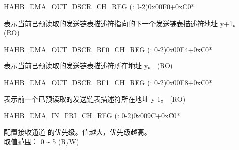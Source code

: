 \begin{register}{H}{AHB\_DMA\_OUT\_DSCR\_CH\_REG (: 0-2)}{0x00F0+0xC0*}\label{regdesc:AHBDMAOUTDSCRCHNREG}
%
\regnewline%
\begin{regdesc}\begin{reglist}
\label{fielddesc:AHBDMAOUTLINKDSCRCHN}\item [AHB\_DMA\_OUTLINK\_DSCR\_CH\regindex{n}] 表示当前已预读取的发送链表描述符指向的下一个发送链表描述符地址 y+1。 (RO)
\end{reglist}\end{regdesc}
\end{register}


\begin{register}{H}{AHB\_DMA\_OUT\_DSCR\_BF0\_CH\_REG (: 0-2)}{0x00F4+0xC0*}\label{regdesc:AHBDMAOUTDSCRBF0CHNREG}
%
\regnewline%
\begin{regdesc}\begin{reglist}
\label{fielddesc:AHBDMAOUTLINKDSCRBF0CHN}\item [AHB\_DMA\_OUTLINK\_DSCR\_BF0\_CH\regindex{n}] 表示当前已预读取的发送链表描述符所在地址 y。 (RO)
\end{reglist}\end{regdesc}
\end{register}


\begin{register}{H}{AHB\_DMA\_OUT\_DSCR\_BF1\_CH\_REG (: 0-2)}{0x00F8+0xC0*}\label{regdesc:AHBDMAOUTDSCRBF1CHNREG}
%
\regnewline%
\begin{regdesc}\begin{reglist}
\label{fielddesc:AHBDMAOUTLINKDSCRBF1CHN}\item [AHB\_DMA\_OUTLINK\_DSCR\_BF1\_CH\regindex{n}] 表示前一个已预读取的发送链表描述符所在地址 y-1。 (RO)
\end{reglist}\end{regdesc}
\end{register}


\begin{register}{H}{AHB\_DMA\_IN\_PRI\_CH\_REG (: 0-2)}{0x009C+0xC0*}\label{regdesc:AHBDMAINPRICHNREG}
%
%
\regnewline%
\begin{regdesc}\begin{reglist}
\label{fielddesc:AHBDMARXPRICHN}\item [AHB\_DMA\_RX\_PRI\_CH\regindex{n}] 配置接收通道  的优先级。值越大，优先级越高。 \\
取值范围： 0 \verb+~+ 5 (R/W)
\end{reglist}\end{regdesc}
\end{register}


